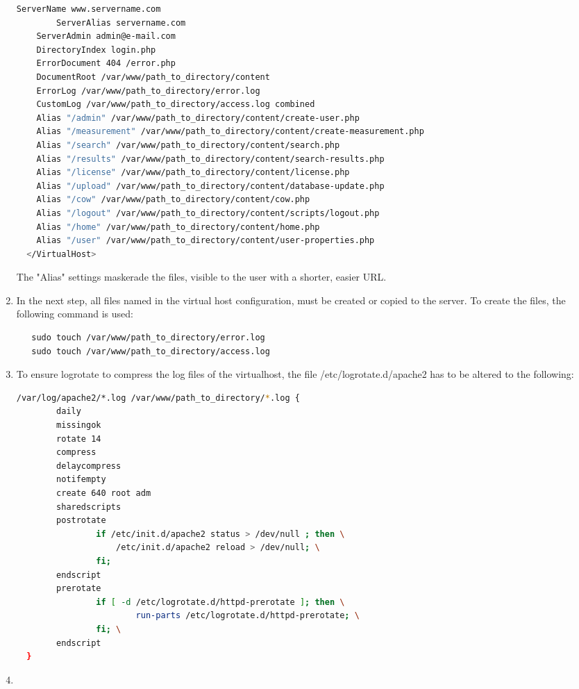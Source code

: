 \begin{enumerate}
\begin{lstlisting}[language=bash]
	ServerName www.servername.com
        ServerAlias servername.com
	ServerAdmin admin@e-mail.com
	DirectoryIndex login.php
	ErrorDocument 404 /error.php
	DocumentRoot /var/www/path_to_directory/content
	ErrorLog /var/www/path_to_directory/error.log
	CustomLog /var/www/path_to_directory/access.log combined
	Alias "/admin" /var/www/path_to_directory/content/create-user.php
	Alias "/measurement" /var/www/path_to_directory/content/create-measurement.php
	Alias "/search" /var/www/path_to_directory/content/search.php
	Alias "/results" /var/www/path_to_directory/content/search-results.php
	Alias "/license" /var/www/path_to_directory/content/license.php
	Alias "/upload" /var/www/path_to_directory/content/database-update.php
	Alias "/cow" /var/www/path_to_directory/content/cow.php
	Alias "/logout" /var/www/path_to_directory/content/scripts/logout.php
	Alias "/home" /var/www/path_to_directory/content/home.php
	Alias "/user" /var/www/path_to_directory/content/user-properties.php
  </VirtualHost>
 \end{lstlisting}
  The "Alias" settings maskerade the files, visible to the user with a shorter, easier URL.
  \item In the next step, all files named in the virtual host configuration, must be created or copied to the server. To create the files, the following command is used:\\
  \begin{lstlisting}
   sudo touch /var/www/path_to_directory/error.log
   sudo touch /var/www/path_to_directory/access.log
  \end{lstlisting}
  \item To ensure logrotate to compress the log files of the virtualhost, the file /etc/logrotate.d/apache2 has to be altered to the following:\\
  \begin{lstlisting}[language=bash]
   /var/log/apache2/*.log /var/www/path_to_directory/*.log {
        daily
        missingok
        rotate 14
        compress
        delaycompress
        notifempty
        create 640 root adm
        sharedscripts
        postrotate
                if /etc/init.d/apache2 status > /dev/null ; then \
                    /etc/init.d/apache2 reload > /dev/null; \
                fi;
        endscript
        prerotate
                if [ -d /etc/logrotate.d/httpd-prerotate ]; then \
                        run-parts /etc/logrotate.d/httpd-prerotate; \
                fi; \
        endscript
  }
  \end{lstlisting}
  
  \item 
\end{enumerate}


